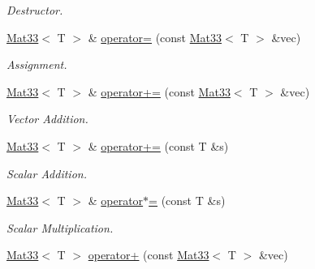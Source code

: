 \begin{DoxyCompactItemize}
\begin{DoxyCompactList}\small\item\em Destructor. \item\end{DoxyCompactList}\item 
\hypertarget{classMath_1_1Mat33_a903a7780e76979a26d600bb9cb43c593}{
\hyperlink{classMath_1_1Mat33}{Mat33}$<$ T $>$ \& \hyperlink{classMath_1_1Mat33_a903a7780e76979a26d600bb9cb43c593}{operator=} (const \hyperlink{classMath_1_1Mat33}{Mat33}$<$ T $>$ \&vec)}
\label{classMath_1_1Mat33_a903a7780e76979a26d600bb9cb43c593}

\begin{DoxyCompactList}\small\item\em Assignment. \item\end{DoxyCompactList}\item 
\hypertarget{classMath_1_1Mat33_af7c85b56becc6b8c8fa4cca4adbc6483}{
\hyperlink{classMath_1_1Mat33}{Mat33}$<$ T $>$ \& \hyperlink{classMath_1_1Mat33_af7c85b56becc6b8c8fa4cca4adbc6483}{operator+=} (const \hyperlink{classMath_1_1Mat33}{Mat33}$<$ T $>$ \&vec)}
\label{classMath_1_1Mat33_af7c85b56becc6b8c8fa4cca4adbc6483}

\begin{DoxyCompactList}\small\item\em Vector Addition. \item\end{DoxyCompactList}\item 
\hypertarget{classMath_1_1Mat33_afbf68a9ff653f96853e07377d0eabf6a}{
\hyperlink{classMath_1_1Mat33}{Mat33}$<$ T $>$ \& \hyperlink{classMath_1_1Mat33_afbf68a9ff653f96853e07377d0eabf6a}{operator+=} (const T \&s)}
\label{classMath_1_1Mat33_afbf68a9ff653f96853e07377d0eabf6a}

\begin{DoxyCompactList}\small\item\em Scalar Addition. \item\end{DoxyCompactList}\item 
\hypertarget{classMath_1_1Mat33_a9b97a697fce00915a43d0586fd8cfa39}{
\hyperlink{classMath_1_1Mat33}{Mat33}$<$ T $>$ \& \hyperlink{classMath_1_1Mat33_a9b97a697fce00915a43d0586fd8cfa39}{operator$\ast$=} (const T \&s)}
\label{classMath_1_1Mat33_a9b97a697fce00915a43d0586fd8cfa39}

\begin{DoxyCompactList}\small\item\em Scalar Multiplication. \item\end{DoxyCompactList}\item 
\hypertarget{classMath_1_1Mat33_a09489d7e4ced56a9bc156611a5709902}{
\hyperlink{classMath_1_1Mat33}{Mat33}$<$ T $>$ \hyperlink{classMath_1_1Mat33_a09489d7e4ced56a9bc156611a5709902}{operator+} (const \hyperlink{classMath_1_1Mat33}{Mat33}$<$ T $>$ \&vec)}
\label{classMath_1_1Mat33_a09489d7e4ced56a9bc156611a5709902}


\end{DoxyCompactItemize}

